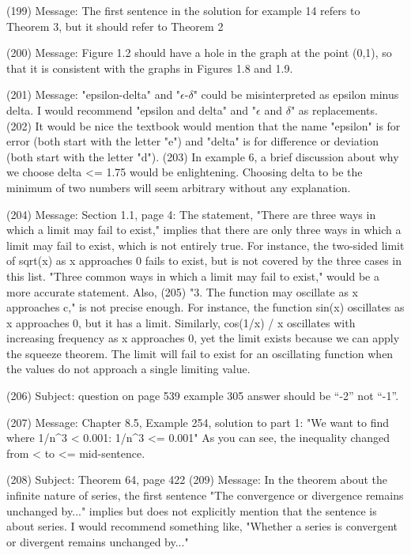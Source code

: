{(199)  Message: The first sentence in the solution for example 14 refers to Theorem 3, but it should refer to Theorem 2

(200)  Message: Figure 1.2 should have a hole in the graph at the point (0,1), so that it is consistent with the graphs in Figures 1.8 and 1.9.

(201)  Message: "epsilon-delta" and "$\epsilon$-$\delta$" could be misinterpreted as epsilon minus delta. I would recommend "epsilon and delta" and "$\epsilon$ and $\delta$" as replacements.       
(202)  It would be nice the textbook would mention that the name "epsilon" is for error (both start with the letter "e") and "delta" is for difference or deviation (both start with the letter "d").       
(203)  In example 6, a brief discussion about why we choose delta <= 1.75 would be enlightening. Choosing delta to be the minimum of two numbers will seem arbitrary without any explanation.

(204)  Message: Section 1.1, page 4: The statement, "There are three ways in which a limit may fail to exist," implies that there are only three ways in which a limit may fail to exist, which is not entirely true. For instance, the two-sided limit of sqrt(x) as x approaches 0 fails to exist, but is not covered by the three cases in this list. "Three common ways in which a limit may fail to exist," would be a more accurate statement. Also,   
(205)  "3. The function may oscillate as x approaches c," is not precise enough. For instance, the function sin(x) oscillates as x approaches 0, but it has a limit. Similarly, cos(1/x) / x oscillates with increasing frequency as x approaches 0, yet the limit exists because we can apply the squeeze theorem. The limit will fail to exist for an oscillating function when the values do not approach a single limiting value.

(206)  Subject: question on page 539 example 305     answer should be ``-2'' not ``-1''.

(207)  Message: Chapter 8.5, Example 254, solution to part 1: "We want to find where 1/n^3 < 0.001: 1/n^3 <= 0.001" As you can see, the inequality changed from < to <= mid-sentence.

(208)  Subject: Theorem 64, page 422
(209)  Message: In the theorem about the infinite nature of series, the first sentence "The convergence or divergence remains unchanged by..." implies but does not explicitly mention that the sentence is about series. I would recommend something like, "Whether a series is convergent or divergent remains unchanged by..."

}
